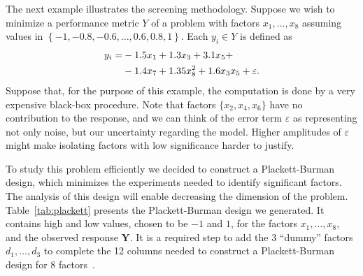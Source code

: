 \documentclass[conference]{IEEEtran}
\begin{document}
The next example illustrates the screening methodology. Suppose we wish to
minimize a performance metric \(Y\) of a problem with factors \(x_1,\dots,x_8\)
assuming values in \(\left\{-1, -0.8, -0.6, \dots, 0.6, 0.8, 1\right\}\). Each
\(y_i \in Y\) is defined as
\vspace{-2pt}
\begin{align}
\label{eq:real_model}
y_i = & -1.5x_1 + 1.3x_3 + 3.1x_5 + \\
& -1.4x_7 + 1.35x_8^2 + 1.6x_3x_5 + \varepsilon\text{.} \nonumber
\vspace{-2pt}
\end{align}\noindent
Suppose that, for the purpose of this example, the computation is done by a very
expensive black-box procedure. Note that factors \(\{x_2,x_4,x_6\}\) have no
contribution to the response, and we can think of the error term \(\varepsilon\)
as representing not only noise, but our uncertainty regarding the model. Higher
amplitudes of \(\varepsilon\) might make isolating factors with low significance
harder to justify.

To study this problem efficiently we decided to construct a Plackett-Burman
design, which minimizes the experiments needed to identify significant factors.
The analysis of this design will enable decreasing the dimension of the problem.
Table~\ref{tab:plackett} presents the Plackett-Burman design we generated.
It contains high and low values, chosen to be \(-1\) and \(1\), for the factors
\(x_1,\dots,x_8\), and the observed response \(\mathbf{Y}\). It is a required step
to add the 3 ``dummy'' factors \(d_1,\dots,d_3\) to complete the 12 columns needed
to construct a Plackett-Burman design for 8
factors~\cite{plackett1946design}.
\end{document}
